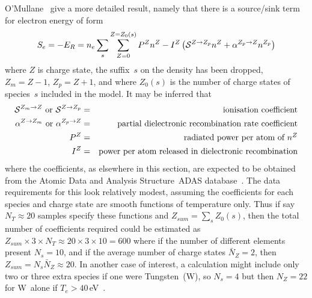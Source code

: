 O'Mullane~\cite{omullane} give a more
detailed result, namely that
there is a source/sink term for electron energy of form 
\begin{equation} \label{eq:eesource}
S_e=-E_R=n_e \sum_s \sum_{Z=0}^{Z=Z_0(s)} P^Z n^Z -
I^Z \left(\mathcal{S}^{Z\rightarrow Z_p}n^Z+\alpha^{Z_p\rightarrow Z}n^{Z_p}\right)
\end{equation}
where $Z$ is charge state,
the suffix~$s$ on the density has been dropped, $Z_m=Z-1$, $Z_p=Z+1$, and
where $Z_0(s)$ is the number of charge states of species~$s$ included in the model.
It may be inferred that
\begin{eqnarray}
\mathcal{S}^{Z_m\rightarrow Z} \mbox{ or }
\mathcal{S}^{Z\rightarrow Z_p} &=&\mbox{ionisation coefficient}\\
\alpha^{Z\rightarrow Z_m} \mbox{ or }
\alpha^{Z_p\rightarrow Z} &=&\mbox{partial dielectronic recombination rate coefficient}\\
P^Z &=&\mbox{radiated power per atom of $n^Z$}\\
I^Z &=&\mbox{power per atom released in dielectronic recombination}
\end{eqnarray}
where the coefficients, as elsewhere in this section, are expected to be obtained from the
Atomic Data and Analysis Structure~ADAS database~\cite {adaswebsite,openadaswebsite}.
The data requirements for this look relatively modest, assuming the coefficients for
each species and charge state are smooth functions of temperature only. Thus if say
$N_T\approx 20$ samples specify these functions 
and $Z_{sum}=\sum_s Z_0(s)$, then the total number of coefficients required
could be estimated as~$Z_{sum} \times 3 \times N_T \approx 20 \times 3 \times 10 =600$ where
if the number of different elements present $N_s=10$, and
if the average number of charge states $\bar{N}_Z=2$, then $Z_{sum} =N_s \bar{N}_Z \approx 20$.
In another case of interest, a calculation might include only two or three extra species if one were Tungsten~(W),
so $N_s=4$ but then $N_Z=22$ for W~alone if $T_e>40$\,eV~\cite{williamswebsite}.

